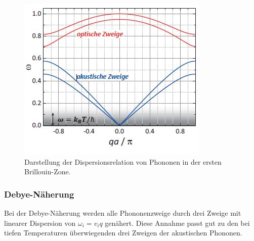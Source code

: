 \begin{figure}
  \centering
  \includegraphics{build/Phononen.jpg}
  \caption{Darstellung der Dispersionsrelation von Phononen in der ersten Brillouin-Zone. \cite{GrossMarx+2018}}
  \label{fig:Phononen}
\end{figure}

\subsubsection{Debye-Näherung}
\label{sec:debye}
Bei der Debye-Näherung werden alle Phononenzweige durch drei Zweige mit linearer Dispersion von $\omega_i=v_iq$ genähert. Diese Annahme passt gut zu den bei tiefen Temperaturen überwiegenden drei Zweigen der akustischen Phononen.

